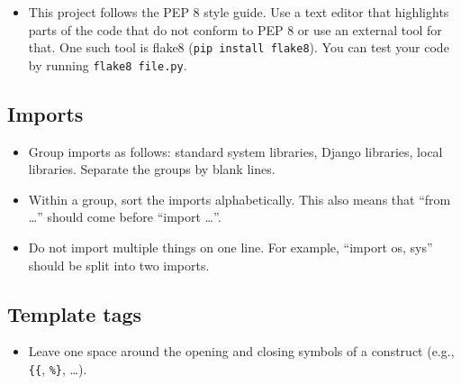 \documentclass{article}
\begin{document}
\begin{itemize}
\item This project follows the PEP 8 style guide. Use a text editor that highlights parts of the code that do not conform to PEP 8 or use an external tool for that. One such tool is flake8 (\texttt{pip install flake8}). You can test your code by running \texttt{flake8 file.py}.
\end{itemize}

\subsection{Imports}

\begin{itemize}
\item Group imports as follows: standard system libraries, Django libraries, local libraries. Separate the groups by blank lines.
\item Within a group, sort the imports alphabetically. This also means that ``from \ldots'' should come before ``import \ldots''.
\item Do not import multiple things on one line. For example, ``import os, sys'' should be split into two imports.
\end{itemize}

\subsection{Template tags}

\begin{itemize}
\item Leave one space around the opening and closing symbols of a construct (e.g., \verb+{{+, \verb+%}+, \ldots).
\end{itemize}
\end{document}
